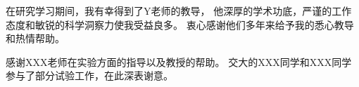 \begin{acknowledgements}

在研究学习期间，我有幸得到了Y老师的教导，
他深厚的学术功底，严谨的工作态度和敏锐的科学洞察力使我受益良多。
衷心感谢他们多年来给予我的悉心教导和热情帮助。

感谢XXX老师在实验方面的指导以及教授的帮助。
交大的XXX同学和XXX同学参与了部分试验工作，在此深表谢意。

\end{acknowledgements}
